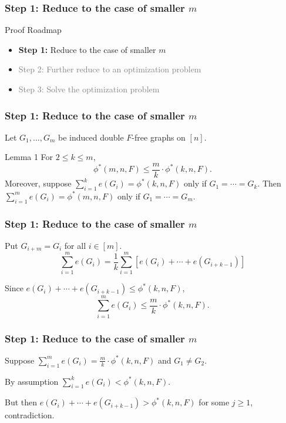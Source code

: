 \documentclass{beamer}
\begin{document}
\begin{frame}
  \frametitle{Step 1: Reduce to the case of smaller $m$}

  Proof Roadmap

  \begin{itemize}
    \item \textbf{Step 1:} Reduce to the case of smaller $m$
    \item \textcolor{gray}{Step 2: Further reduce to an optimization problem}
    \item \textcolor{gray}{Step 3: Solve the optimization problem}
  \end{itemize}
\end{frame}

\begin{frame}
  \frametitle{Step 1: Reduce to the case of smaller $m$}

  Let $G_1, \ldots, G_m$ be induced double $F$-free graphs on $[n]$.

  \begin{block}{Lemma 1}
    For $2 \leq k \leq m$,
    \[
      \phi^*(m,n,F) \leq \frac{m}{k} \cdot \phi^*(k, n, F).
    \]
    Moreover, suppose $\sum_{i = 1}^k e(G_i) = \phi^*(k, n, F)$ only if $G_1 = \cdots = G_k$. Then $\sum_{i = 1}^m e(G_i) = \phi^*(m, n, F)$ only if $G_1 = \cdots = G_m$.
  \end{block}
\end{frame}

\begin{frame}
  \frametitle{Step 1: Reduce to the case of smaller $m$}

  Put $G_{i + m} = G_i$ for all $i \in [m]$.
  \[
    \sum_{i = 1}^m e(G_i) 
    = \frac{1}{k}\sum_{i = 1}^m [e(G_i) + \cdots + e(G_{i + k - 1})]
  \]

  \pause

  Since $e(G_i) + \cdots + e(G_{i + k - 1}) \leq \phi^*(k, n, F)$,
  \[
    \sum_{i = 1}^m e(G_i) \leq \frac{m}{k} \cdot \phi^*(k, n, F).
  \]
\end{frame}

\begin{frame}
  \frametitle{Step 1: Reduce to the case of smaller $m$}

  Suppose $\sum_{i = 1}^m e(G_i) = \frac{m}{k} \cdot \phi^*(k, n, F)$ and $G_1 \neq G_2$. 

  \pause

  \vspace{0.5cm}

  By assumption $\sum_{i = 1}^k e(G_i) < \phi^*(k, n, F)$. 

  \pause

  \vspace{0.5cm}
  
  But then $e(G_i) + \cdots + e(G_{i + k - 1}) > \phi^*(k, n, F)$ for some $j \geq 1$, contradiction.
\end{frame}
\end{document}
